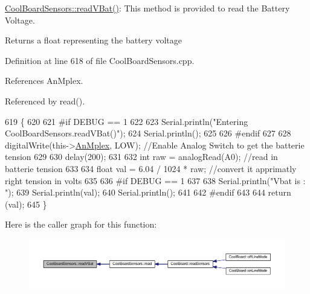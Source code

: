 \hyperlink{classCoolBoardSensors_a6944b6ea7bce8e2fce1b434acfd9d5f3}{Cool\+Board\+Sensors\+::read\+V\+Bat()}\+: This method is provided to read the Battery Voltage.

\begin{DoxyReturn}{Returns}
a float representing the battery voltage 
\end{DoxyReturn}


Definition at line 618 of file Cool\+Board\+Sensors.\+cpp.



References An\+Mplex.



Referenced by read().


\begin{DoxyCode}
619 \{
620 
621 \textcolor{preprocessor}{#if DEBUG == 1}
622 
623     Serial.println(\textcolor{stringliteral}{"Entering CoolBoardSensors.readVBat()"});
624     Serial.println();
625 
626 \textcolor{preprocessor}{#endif}
627 
628     digitalWrite(this->\hyperlink{classCoolBoardSensors_a12ef28b1046219e0aee10bf64e28c4a5}{AnMplex}, LOW);                            \textcolor{comment}{//Enable Analog Switch to get the
       batterie tension}
629     
630     delay(200);
631     
632     \textcolor{keywordtype}{int} raw = analogRead(A0);                                    \textcolor{comment}{//read in batterie tension}
633     
634     \textcolor{keywordtype}{float} val = 6.04 / 1024 * raw;                               \textcolor{comment}{//convert it apprimatly right tension in
       volts}
635     
636 \textcolor{preprocessor}{#if DEBUG == 1}
637 
638     Serial.println(\textcolor{stringliteral}{"Vbat is : "});
639     Serial.println(val);
640     Serial.println();
641 
642 \textcolor{preprocessor}{#endif}
643 
644     \textcolor{keywordflow}{return} (val);   
645 \}
\end{DoxyCode}
Here is the caller graph for this function\+:\nopagebreak
\begin{figure}[H]
\begin{center}
\leavevmode
\includegraphics[width=350pt]{classCoolBoardSensors_a6944b6ea7bce8e2fce1b434acfd9d5f3_icgraph}
\end{center}
\end{figure}
\mbox{\label{classCoolBoardSensors_a406307ffd70272282d91479c7ed8d66f}} 
